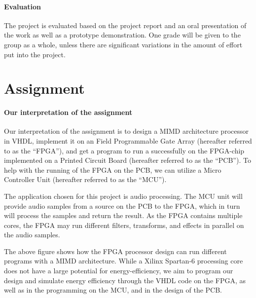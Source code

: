 \paragraph{Evaluation}
The project is evaluated based on the project report and an oral presentation of
the work as well as a prototype demonstration. One grade will be given to the
group as a whole, unless there are significant variations in the amount of
effort put into the project.

\section{Assignment}\label{intro:our-assignment-interpretation}

\paragraph{Our interpretation of the assignment}
Our interpretation of the assignment is to design a MIMD architecture processor
in VHDL, implement it on an Field Programmable Gate Array (hereafter referred to
as the ``FPGA''), and get a program to run a successfully on the FPGA-chip
implemented on a Printed Circuit Board (hereafter referred to as the ``PCB'').
To help with the running of the FPGA on the PCB, we can utilize a
Micro Controller Unit (hereafter referred to as the ``MCU'').


The application chosen for this project is audio processing. The MCU unit will
provide audio samples from a source on the PCB to the FPGA, which in turn will
process the samples and return the result. As the FPGA contains multiple cores,
the FPGA may run different filters, transforms, and effects in parallel on the
audio samples.


The above figure shows how the FPGA processor
design can run different programs with a MIMD architecture. While a Xilinx
Spartan-6\cite{fpga-chip} processing core does not have a large potential for
energy-efficiency, we aim to program our design and simulate energy efficiency
through the VHDL code on the FPGA, as well as in the programming on the MCU, and
in the design of the PCB.
